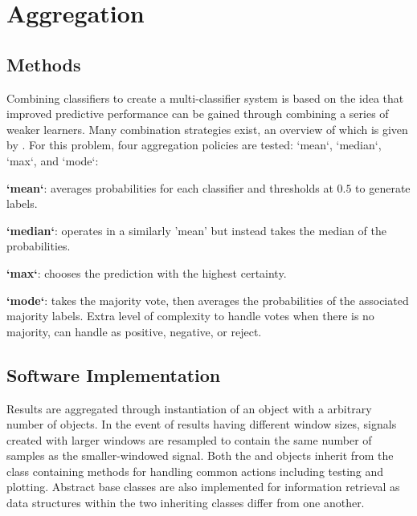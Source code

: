 \section{Aggregation}
\label{sec:pl-agg}
    
    \subsection{Methods}
    \label{subsec:pl-agg-methods}
        Combining classifiers to create a multi-classifier system is based on the idea that improved predictive performance can be gained through combining a series of weaker learners. Many combination strategies exist, an overview of which is given by \textcite{Suen2000}. For this problem, four aggregation policies are tested: `mean`, `median`, `max`, and `mode`:
        \begin{sitemize}
            \item\textbf{`mean`}: averages probabilities for each classifier and thresholds at $0.5$ to generate labels. 
            \item\textbf{`median`}: operates in a similarly 'mean' but instead takes the median of the probabilities. 
            \item\textbf{`max`}: chooses the prediction with the highest certainty.
            \item\textbf{`mode`}: takes the majority vote, then averages the probabilities of the associated majority labels. Extra level of complexity to handle votes when there is no majority, can handle as positive, negative, or reject.
        \end{sitemize}
        
    \subsection{Software Implementation}
    \label{subsec:pl-agg-software}
        Results are aggregated through instantiation of an  object with a arbitrary number of  objects. In the event of results having different window sizes, signals created with larger windows are resampled to contain the same number of samples as the smaller-windowed signal. Both the  and  objects inherit from the  class containing methods for handling common actions including testing and plotting. Abstract base classes are also implemented for information retrieval as data structures within the two inheriting classes differ from one another.